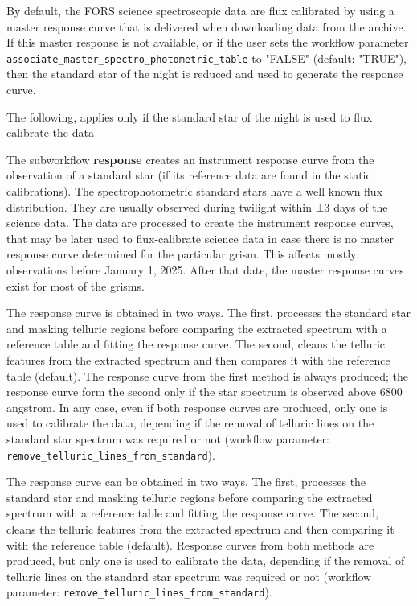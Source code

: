 By default, 
the FORS science spectroscopic data are flux calibrated by using a master response curve that is delivered when
downloading data from the archive. If this master response is not available, or if the user sets the workflow parameter {\tt associate\_master\_spectro\_photometric\_table} to "FALSE" (default: "TRUE"), then the standard star of the night is reduced and used to generate the response curve.

The following, applies only if the standard star of the night is used to flux calibrate the data



The subworkflow {\bf response} creates an instrument response curve from the observation of a standard star (if its reference data are found in the static calibrations).
The spectrophotometric standard stars have a well known flux distribution. They are usually observed during twilight within ±3 days of the science data.
The data are processed to create the instrument response curves, that may be later used to flux-calibrate science data in case there is no master response curve determined for the particular grism. This affects mostly observations before January 1, 2025. After that date, the master response curves exist for most of the grisms.

The response curve is obtained in two ways. The first, processes the standard star and masking telluric regions before comparing the extracted spectrum with a reference table and fitting the response curve. The second, cleans the telluric features from the extracted spectrum and then compares it with the reference table (default).
The response curve from the first method is always produced; the response curve form the second only if the star spectrum is observed above 6800 angstrom. In any case, even if both response curves are produced, only one is used to calibrate the data, depending if the removal of telluric lines on the standard star spectrum was required or not (workflow parameter: {\tt remove\_telluric\_lines\_from\_standard}).





The response curve can be obtained in two ways. The first, processes the standard star and masking telluric regions before comparing the extracted spectrum with a reference table and fitting the response curve. The second, cleans the telluric features from the extracted spectrum and then comparing it with the reference table (default).
Response curves from both methods are produced, but only one is used to calibrate the data, depending if the removal of telluric lines on the standard star spectrum was required or not (workflow parameter: {\tt remove\_telluric\_lines\_from\_standard}). 

